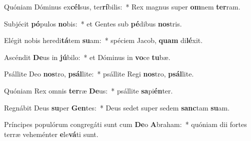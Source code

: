 \item Quóniam Dóminus ex\textbf{cél}sus, ter\textbf{rí}bilis:~* Rex magnus super \textbf{om}nem \textbf{ter}ram.
\item Subjécit \textbf{pó}pulos \textbf{no}bis:~* et Gentes sub \textbf{pé}dibus \textbf{nos}tris.
\item Elégit nobis heredi\textbf{tá}tem \textbf{su}am:~* spéciem Jacob, \textbf{quam} di\textbf{lé}xit.
\item Ascéndit \textbf{De}us in \textbf{jú}bilo:~* et Dóminus in \textbf{vo}ce \textbf{tu}bæ.
\item Psállite Deo \textbf{nos}tro, \textbf{psál}lite:~* psállite Regi \textbf{nos}tro, \textbf{psál}lite.
\item Quóniam Rex omnis \textbf{ter}ræ \textbf{De}us:~* psállite \textbf{sa}pi\textbf{én}ter.
\item Regnábit Deus \textbf{su}per \textbf{Gen}tes:~* Deus sedet super sedem \textbf{sanc}tam \textbf{su}am.
\item Príncipes populórum congregáti sunt cum \textbf{De}o \textbf{A}braham:~* quóniam dii fortes terræ veheménter \textbf{e}le\textbf{vá}ti sunt.
